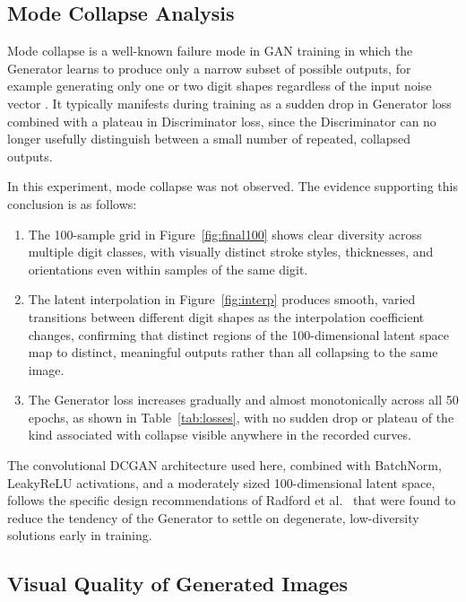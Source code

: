 \documentclass[12pt,a4paper]{article}
\begin{document}
\subsection{Mode Collapse Analysis}
\label{sec:modecollapse}

Mode collapse is a well-known failure mode in GAN training in which the Generator
learns to produce only a narrow subset of possible outputs, for example generating only
one or two digit shapes regardless of the input noise vector \cite{salimans2016}. It
typically manifests during training as a sudden drop in Generator loss combined with a
plateau in Discriminator loss, since the Discriminator can no longer usefully
distinguish between a small number of repeated, collapsed outputs.

In this experiment, mode collapse was not observed. The evidence supporting this
conclusion is as follows:

\begin{enumerate}
    \item The 100-sample grid in Figure~\ref{fig:final100} shows clear diversity across
          multiple digit classes, with visually distinct stroke styles, thicknesses, and
          orientations even within samples of the same digit.
    \item The latent interpolation in Figure~\ref{fig:interp} produces smooth, varied
          transitions between different digit shapes as the interpolation coefficient
          changes, confirming that distinct regions of the 100-dimensional latent space
          map to distinct, meaningful outputs rather than all collapsing to the same
          image.
    \item The Generator loss increases gradually and almost monotonically across all 50
          epochs, as shown in Table~\ref{tab:losses}, with no sudden drop or plateau of
          the kind associated with collapse visible anywhere in the recorded curves.
\end{enumerate}

The convolutional DCGAN architecture used here, combined with BatchNorm, LeakyReLU
activations, and a moderately sized 100-dimensional latent space, follows the specific
design recommendations of Radford et al.\ \cite{radford2015} that were found to reduce
the tendency of the Generator to settle on degenerate, low-diversity solutions early in
training.

\subsection{Visual Quality of Generated Images}
\label{sec:visualquality}
\end{document}
